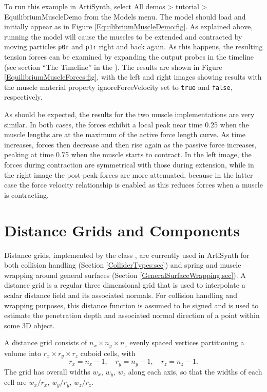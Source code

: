 To run this example in ArtiSynth, select {\sf All demos > tutorial >
EquilibriumMuscleDemo} from the {\sf Models} menu. The model should
load and initially appear as in Figure
\ref{EquilibriumMuscleDemo:fig}.  As explained above, running the
model will cause the muscles to be extended and contracted by moving
particles {\tt p0r} and {\tt p1r} right and back again. As this
happens, the resulting tension forces can be examined by expanding the
output probes in the timeline (see section ``The Timeline'' in the
). The
results are shown in Figure \ref{EquilibriumMuscleForces:fig}, with
the left and right images showing results with the muscle material
property {\sf ignoreForceVelocity} set to {\tt true} and {\tt false},
respectively.

As should be expected, the results for the two muscle implementations
are very similar.  In both cases, the forces exhibit a local peak near
time 0.25 when the muscle lengths are at the maximum of the active
force length curve. As time increases, forces then decrease and then
rise again as the passive force increases, peaking at time 0.75 when
the muscle starts to contract. In the left image, the forces during
contraction are symmetrical with those during extension, while in the
right image the post-peak forces are more attenuated, because in the
latter case the force velocity relationship is enabled as this reduces
forces when a muscle is contracting.

\section{Distance Grids and Components}
\label{DistanceGrids:sec}

Distance grids, implemented by the class
, are currently used in
ArtiSynth for both collision handling (Section
\ref{ColliderTypes:sec}) and spring and muscle wrapping around
general surfaces (Section \ref{GeneralSurfaceWrapping:sec}).  A
distance grid is a regular three dimensional grid that is used to
interpolate a scalar distance field and its associated normals.
For collision handling and wrapping purposes, this distance function
is assumed to be signed and is used to estimate the penetration depth
and associated normal direction of a point within some 3D object.

A distance grid consists of $n_x \times n_y \times n_z$ evenly spaced
vertices partitioning a volume into $r_x \times r_y \times r_z$ cuboid
cells, with
%
\begin{equation*}
r_x = n_x-1, \quad r_y = n_y-1, \quad r_z = n_z-1.
\end{equation*}
%
The grid has overall widths $w_x$, $w_y$, $w_z$ along each axis, so
that the widths of each cell are $w_x/r_x$, $w_y/r_y$, $w_z/r_z$. 

